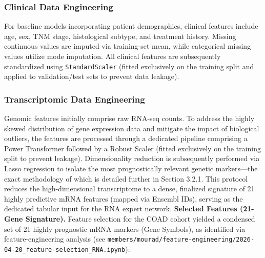 \documentclass[11pt,a4paper]{article}
\begin{document}
\subsubsection{Clinical Data Engineering}
For baseline models incorporating patient demographics, clinical features include age, sex, TNM stage, histological subtype, and treatment history. Missing continuous values are imputed via training-set mean, while categorical missing values utilize mode imputation. All clinical features are subsequently standardized using \texttt{StandardScaler} (fitted exclusively on the training split and applied to validation/test sets to prevent data leakage).

\subsubsection{Transcriptomic Data Engineering}
Genomic features initially comprise raw RNA-seq counts. To address the highly skewed distribution of gene expression data and mitigate the impact of biological outliers, the features are processed through a dedicated pipeline comprising a Power Transformer followed by a Robust Scaler (fitted exclusively on the training split to prevent leakage). Dimensionality reduction is subsequently performed via Lasso regression to isolate the most prognostically relevant genetic markers—the exact methodology of which is detailed further in Section 3.2.1. This protocol reduces the high-dimensional transcriptome to a dense, finalized signature of 21 highly predictive mRNA features (mapped via Ensembl IDs), serving as the dedicated tabular input for the RNA expert network.
\textbf{Selected Features (21-Gene Signature).} Feature selection for the COAD cohort yielded a condensed set of 21 highly prognostic mRNA markers (Gene Symbols), as identified via feature-engineering analysis (see \texttt{members/mourad/feature-engineering/2026-04-20\_feature-selection\_RNA.ipynb}):
\end{document}
